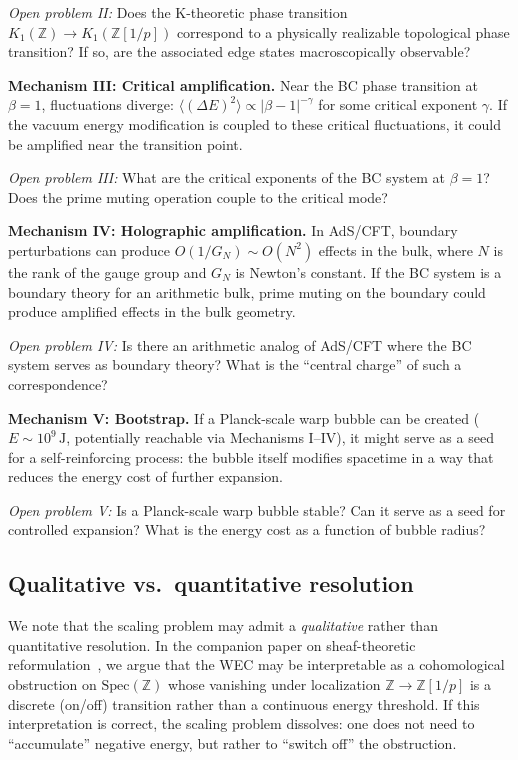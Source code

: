 \documentclass[aps,prd,twocolumn,superscriptaddress,nofootinbib]{revtex4-2}
\newcommand{\Spec}{\mathrm{Spec}}
\newcommand{\Zp}{\mathbb{Z}[1/p]}
\begin{document}
\textit{Open problem II:} Does the K-theoretic phase transition
$K_1(\mathbb{Z}) \to K_1(\Zp)$ correspond to a
physically realizable topological phase transition?
If so, are the associated edge states macroscopically
observable?

\textbf{Mechanism III: Critical amplification.}
Near the BC phase transition at $\beta = 1$, fluctuations
diverge: $\langle (\Delta E)^2 \rangle \propto |\beta - 1|^{-\gamma}$
for some critical exponent $\gamma$. If the vacuum energy
modification is coupled to these critical fluctuations, it
could be amplified near the transition point.

\textit{Open problem III:} What are the critical exponents
of the BC system at $\beta = 1$? Does the prime muting
operation couple to the critical mode?

\textbf{Mechanism IV: Holographic amplification.}
In AdS/CFT, boundary perturbations can produce
$O(1/G_N) \sim O(N^2)$ effects in the bulk, where $N$
is the rank of the gauge group and $G_N$ is Newton's constant.
If the BC system is a boundary theory for an arithmetic bulk,
prime muting on the boundary could produce amplified effects
in the bulk geometry.

\textit{Open problem IV:} Is there an arithmetic analog of
AdS/CFT where the BC system serves as boundary theory?
What is the ``central charge'' of such a correspondence?

\textbf{Mechanism V: Bootstrap.}
If a Planck-scale warp bubble can be created
($E \sim 10^9\,\mathrm{J}$, potentially reachable
via Mechanisms I--IV), it might serve as a seed for
a self-reinforcing process: the bubble itself modifies
spacetime in a way that reduces the energy cost of
further expansion.

\textit{Open problem V:} Is a Planck-scale warp bubble
stable? Can it serve as a seed for controlled expansion?
What is the energy cost as a function of bubble radius?

\subsection{Qualitative vs.\ quantitative resolution}

We note that the scaling problem may admit a
\emph{qualitative} rather than quantitative resolution.
In the companion paper on sheaf-theoretic
reformulation~\cite{paper_B}, we argue that the WEC
may be interpretable as a cohomological obstruction
on $\Spec(\mathbb{Z})$ whose vanishing under localization
$\mathbb{Z} \to \Zp$ is a discrete (on/off) transition
rather than a continuous energy threshold. If this
interpretation is correct, the scaling problem dissolves:
one does not need to ``accumulate'' negative energy, but
rather to ``switch off'' the obstruction.
\end{document}
